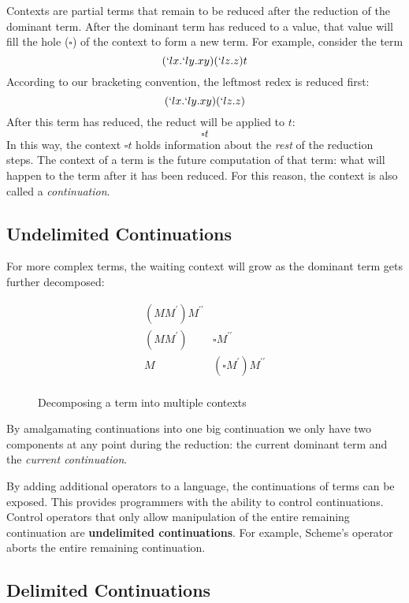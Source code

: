   Contexts are partial terms that remain to be reduced after the reduction of the dominant term.
  After the dominant term has reduced to a value,
  that value will fill the hole ($\square$) of the context to form a new term. 
  For example, consider the term 
  \[
    (`lx.`ly.xy)(`lz.z)t
  \]
  According to our bracketing convention, the leftmost redex is reduced first:
  \[
    (`lx.`ly.xy)(`lz.z) 
  \]
  After this term has reduced, the reduct will be applied to $t$:
  \[
    \square t 
  \]
  In this way, the context $\square t$ holds information about the \emph{rest} of the reduction steps.
  The context of a term is the future computation of that term: what will happen to the term after it has been reduced.
  For this reason, the context is also called a \emph{continuation}.
 
  \subsection{Undelimited Continuations} 
 
  For more complex terms, the waiting context will grow as the dominant term gets further decomposed:
  
  \begin{figure}[H]
    \[
    \begin{array}{ll}
      (MM^\prime) M^{\prime\prime} \\
      (MM^\prime) & \square M^{\prime\prime} \\
      M & (\square M^\prime) M^{\prime\prime} \\
    \end{array}
    \]
  \caption{Decomposing a term into multiple contexts}
  \end{figure}

  By amalgamating continuations into one big continuation we only have two components at any point during the reduction: 
  the current dominant term and the \emph{current continuation}. 
 
  By adding additional operators to a language, the continuations of terms can be exposed.
  This provides programmers with the ability to control continuations.
  Control operators that only allow manipulation of the entire remaining continuation are \textbf{undelimited continuations}. 
  For example, Scheme's  operator aborts the entire remaining continuation.

  \subsection{Delimited Continuations}

